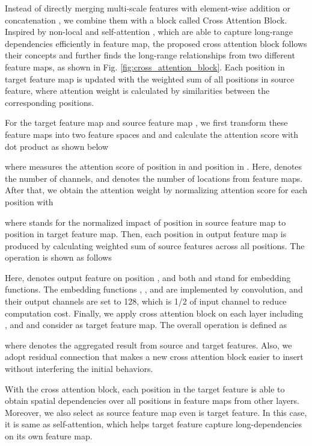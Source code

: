 \documentclass[runningheads]{llncs}
\begin{document}
Instead of directly merging multi-scale features with element-wise addition or concatenation \cite{Zhao2016,Xiong2019,Pang,Porzi2019a}, we combine them with a block called Cross Attention Block. Inspired by non-local \cite{Wang2018} and self-attention \cite{Zhang,Fu,Vaswani2017}, which are able to capture long-range dependencies efficiently in feature map, the proposed cross attention block follows their concepts and further finds the long-range relationships from two different feature maps, as shown in Fig. \ref{fig:cross_attention_block}. Each position in target feature map is updated with the weighted sum of all positions in source feature, where attention weight is calculated by similarities between the corresponding positions.

For the target feature map  and source feature map , we first transform these feature maps into two feature spaces  and  and calculate the attention score  with dot product as shown below

where  measures the attention score of position  in  and position  in . Here,  denotes the number of channels, and  denotes the number of locations from feature maps. After that, we obtain the attention weight  by normalizing attention score for each position  with 

where  stands for the normalized impact of position  in source feature map to position  in target feature map. Then, each position in output feature map  is produced by calculating weighted sum of source features across all positions. The operation is shown as follows

Here,  denotes output feature on position , and both  and  stand for embedding functions. The embedding functions , ,  and  are implemented by  convolution, and their output channels are set to 128, which is 1/2 of input channel to reduce computation cost. Finally, we apply cross attention block on each layer including ,  and  and consider  as target feature map. The overall operation is defined as

where  denotes the aggregated result from source and target features. Also, we adopt residual connection that makes a new cross attention block easier to insert without interfering the initial behaviors. 
 
With the cross attention block, each position in the target feature is able to obtain spatial dependencies over all positions in feature maps from other layers. Moreover, we also select  as source feature map even  is target feature. In this case, it is same as self-attention, which helps target feature capture long-dependencies on its own feature map. 
\end{document}
